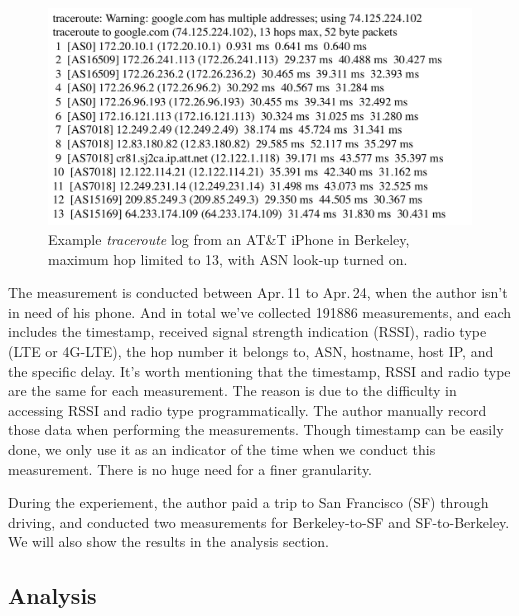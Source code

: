 \begin{figure}[!htb]
  \centering
  \includegraphics[width=1.1\linewidth]{../figs/traceroute.pdf}
  \vspace{-1em}
  \caption{Example {\it traceroute} log from an AT\&T iPhone in Berkeley, maximum hop limited to 13, with ASN look-up turned on.}
  \label{fig:traceroute}
\end{figure}


The measurement is conducted between Apr.\,11 to Apr.\,24, when the author isn't in need of his phone. And in total we've collected 191886 measurements, and each includes the timestamp, received signal strength indication (RSSI), radio type (LTE or 4G-LTE), the hop number it belongs to, ASN, hostname, host IP, and the specific delay. It's worth mentioning that the timestamp, RSSI and radio type are the same for each measurement. The reason is due to the difficulty in accessing RSSI and radio type programmatically. The author manually record those data when performing the measurements. Though timestamp can be easily done, we only use it as an indicator of the time when we conduct this measurement. There is no huge need for a finer granularity.

During the experiement, the author paid a trip to San Francisco (SF) through driving, and conducted two measurements for Berkeley-to-SF and SF-to-Berkeley. We will also show the results in the analysis section. 


\subsection{Analysis}
\label{sec:analysis}

